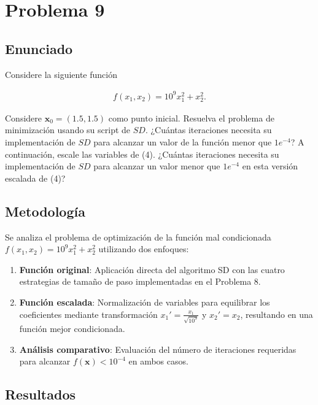 \documentclass{article}
\begin{document}
\section{Problema 9}

\subsection{Enunciado}
Considere la siguiente función

\begin{align}
    f(x_1, x_2) = 10^{9}x_1^{2} + x_2^{2}. \tag{4}
\end{align}

Considere $\mathbf{x}_0 = (1.5, 1.5)$ como punto inicial. Resuelva el problema de minimización usando su script de $SD$. ¿Cuántas iteraciones necesita su implementación de $SD$ para alcanzar un valor de la función menor que $1e^{-4}$? A continuación, escale las variables de (4). ¿Cuántas iteraciones necesita su implementación de $SD$ para alcanzar un valor menor que $1e^{-4}$ en esta versión escalada de (4)?

\subsection{Metodología}

Se analiza el problema de optimización de la función mal condicionada $f(x_1, x_2) = 10^9 x_1^2 + x_2^2$ utilizando dos enfoques:

\begin{enumerate}
    \item \textbf{Función original}: Aplicación directa del algoritmo SD con las cuatro estrategias de tamaño de paso implementadas en el Problema 8.
    
    \item \textbf{Función escalada}: Normalización de variables para equilibrar los coeficientes mediante transformación $x_1' = \frac{x_1}{\sqrt{10^9}}$ y $x_2' = x_2$, resultando en una función mejor condicionada.
    
    \item \textbf{Análisis comparativo}: Evaluación del número de iteraciones requeridas para alcanzar $f(\mathbf{x}) < 10^{-4}$ en ambos casos.
\end{enumerate}

\subsection{Resultados}
\setcounter{equation}{0}
\end{document}
